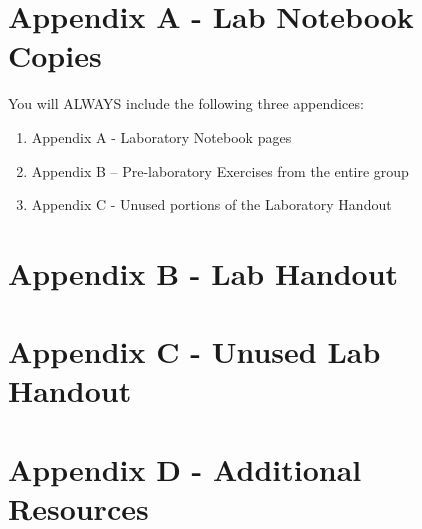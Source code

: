 \appendix
\addappheadtotoc
\section*{Appendix A - Lab Notebook Copies}
You will ALWAYS include the following three appendices:
\begin{enumerate}
	\item Appendix A - Laboratory Notebook pages
	\item Appendix B – Pre-laboratory Exercises from the entire group 
	\item Appendix C - Unused portions of the Laboratory Handout
\end{enumerate}


\section*{Appendix B - Lab Handout}
 

\section*{Appendix C - Unused Lab Handout}
 

\section*{Appendix D - Additional Resources}